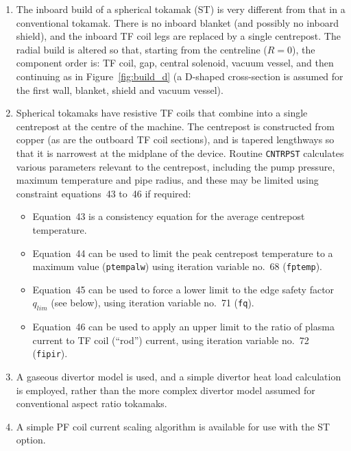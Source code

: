 \documentclass[11pt,a4paper]{report}
\begin{document}
\begin{enumerate}

\item The inboard build of a spherical tokamak (ST) is very different from
  that in a conventional tokamak. There is no inboard blanket (and possibly no
  inboard shield), and the inboard TF coil legs are replaced by a single
  centrepost. The radial build is altered so that, starting from the
  centreline ($R = 0$), the component order is: TF coil, gap, central
  solenoid, vacuum vessel, and then continuing as in Figure~\ref{fig:build_d}
  (a D-shaped cross-section is assumed for the first wall, blanket, shield and
  vacuum vessel).

\item Spherical tokamaks have resistive TF coils that combine into a single
  centrepost at the centre of the machine. The centrepost is constructed from
  copper (as are the outboard TF coil sections), and is tapered lengthways so
  that it is narrowest at the midplane of the device.  Routine
  \texttt{CNTRPST} calculates various parameters relevant to the centrepost,
  including the pump pressure, maximum temperature and pipe radius, and these
  may be limited using constraint equations~43 to~46 if required:
  \begin{itemize}
  \item Equation~43 is a consistency equation for the average centrepost
    temperature.
  \item Equation~44 can be used to limit the peak centrepost temperature to a
    maximum value (\texttt{ptempalw}) using iteration variable no.\ 68
    (\texttt{fptemp}).
  \item Equation~45 can be used to force a lower limit to the edge safety
    factor $q_{lim}$ (see below), using iteration variable no.\ 71 (\texttt{fq}).
  \item Equation~46 can be used to apply an upper limit to the ratio of plasma
    current to TF coil (``rod'') current, using iteration variable no.\ 72
    (\texttt{fipir}).
  \end{itemize}

\item A gaseous divertor model is used, and a simple divertor heat load
  calculation is employed, rather than the more complex divertor model assumed
  for conventional aspect ratio tokamaks.

\item A simple PF coil current scaling algorithm is available for use with the
  ST option.


\end{enumerate}
\end{document}
